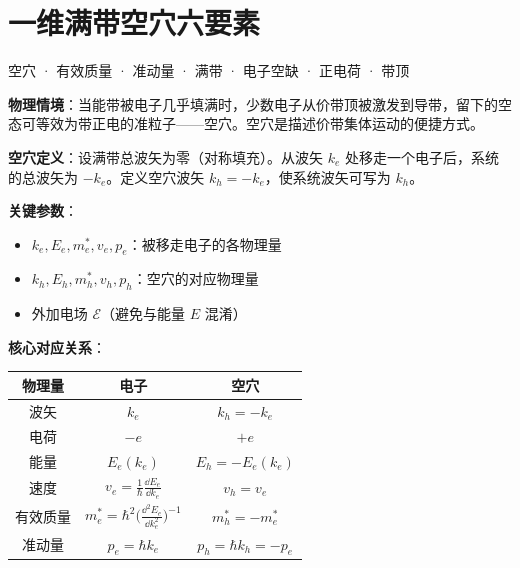
\section{一维满带空穴六要素}
\label{sec:hole-concept}

\begin{tipbox}[关键词标签]
空穴 · 有效质量 · 准动量 · 满带 · 电子空缺 · 正电荷 · 带顶
\end{tipbox}

\begin{modelbox}[模型：一维满带中的空穴]
\textbf{物理情境}：当能带被电子几乎填满时，少数电子从价带顶被激发到导带，留下的空态可等效为带正电的准粒子——空穴。空穴是描述价带集体运动的便捷方式。

\textbf{空穴定义}：设满带总波矢为零（对称填充）。从波矢 $k_e$ 处移走一个电子后，系统的总波矢为 $-k_e$。定义空穴波矢 $k_h=-k_e$，使系统波矢可写为 $k_h$。

\textbf{关键参数}：
\begin{itemize}[nosep]
    \item $k_e, E_e, m_e^*, v_e, p_e$：被移走电子的各物理量
    \item $k_h, E_h, m_h^*, v_h, p_h$：空穴的对应物理量
    \item 外加电场 $\mathcal{E}$（避免与能量 $E$ 混淆）
\end{itemize}

\textbf{核心对应关系}：
\begin{center}
\begin{tabular}{ccc}
\toprule
\textbf{物理量} & \textbf{电子} & \textbf{空穴} \\
\midrule
波矢 & $k_e$ & $k_h=-k_e$ \\
电荷 & $-e$ & $+e$ \\
能量 & $E_e(k_e)$ & $E_h=-E_e(k_e)$ \\
速度 & $v_e=\frac{1}{\hbar}\frac{\dd E_e}{\dd k_e}$ & $v_h=v_e$ \\
有效质量 & $m_e^*=\hbar^2\bigl(\frac{\dd^2E_e}{\dd k_e^2}\bigr)^{-1}$ & $m_h^*=-m_e^*$ \\
准动量 & $p_e=\hbar k_e$ & $p_h=\hbar k_h=-p_e$ \\
\bottomrule
\end{tabular}
\end{center}
\end{modelbox}

